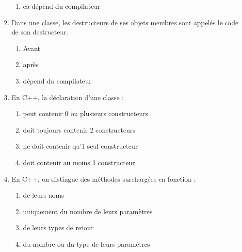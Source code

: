 \begin{enumerate}
\begin{enumerate}
              \item ca dépend du compilateur
          \end{enumerate}
    \item Dans une classe, les destructeurs de ses objets membres sont appelés le code de son destructeur.
          \begin{enumerate}
              \item Avant
              \item après
              \item dépend du compilateur
          \end{enumerate}
    \item En C++, la déclaration d’une classe :
          \begin{enumerate}
              \item peut contenir 0 ou plusieurs constructeurs
              \item doit toujours contenir 2 constructeurs
              \item ne doit contenir qu’1 seul constructeur
              \item doit contenir au moins 1 constructeur
          \end{enumerate}
    \item En C++, on distingue des méthodes surchargées en fonction :
          \begin{enumerate}
              \item de leurs noms
              \item uniquement du nombre de leurs paramètres
              \item  de leurs types de retour
              \item du nombre ou du type de leurs paramètres
          \end{enumerate}
\end{enumerate}